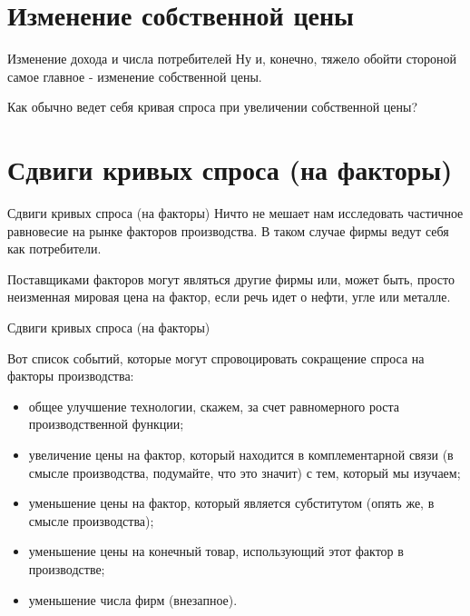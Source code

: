 \documentclass{beamer}
\begin{document}
\section{Изменение собственной цены}
\begin{frame}{Изменение дохода и числа потребителей}
Ну и, конечно, тяжело обойти стороной самое главное - изменение собственной цены.

Как обычно ведет себя кривая спроса при увеличении собственной цены?
\end{frame}

\section{Сдвиги кривых спроса (на факторы)}

\begin{frame}{Сдвиги кривых спроса (на факторы)}
Ничто не мешает нам исследовать частичное равновесие на рынке факторов производства. В таком случае фирмы ведут себя как потребители. 

Поставщиками факторов могут являться другие фирмы или, может быть, просто неизменная мировая цена на фактор, если речь идет о нефти, угле или металле.
	
\end{frame}

\begin{frame}{Сдвиги кривых спроса (на факторы)}

Вот список событий, которые могут спровоцировать сокращение спроса на факторы производства:

\begin{itemize}
\item общее улучшение технологии, скажем, за счет равномерного роста производственной функции;
\item увеличение цены на фактор, который находится в комплементарной связи (в смысле производства, подумайте,  что это значит) с тем, который мы изучаем;
\item уменьшение цены на фактор, который является субститутом (опять же, в смысле производства);
\item уменьшение цены на конечный товар, использующий этот фактор в производстве;
\item уменьшение числа фирм (внезапное).
\end{itemize}
	
\end{frame}
\end{document}
